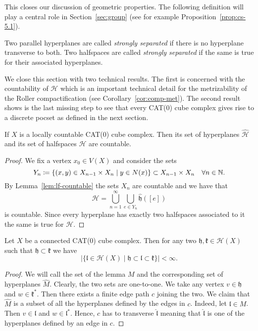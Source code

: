 This closes our discussion of geometric properties. The following definition will play a central role in Section~\ref{sec:group} (see for example Proposition~\ref{prop:cs-5.1}).

\begin{defin}
  \label{defin:strong-sep}
  Two parallel hyperplanes are called \emph{strongly separated} if there is no hyperplane transverse to both. Two halfspaces are called \emph{strongly separated} if the same is true for their associated hyperplanes.
\end{defin}

We close this section with two technical results. The first is concerned with the countability of \(\mathcal{H}\) which is an important technical detail for the metrizability of the Roller compactification (see Corollary~\ref{cor:comp-met}). The second result shows is the last missing step to see that every CAT(0) cube complex gives rise to a discrete pocset as defined in the next section.

\begin{cor}
  \label{cor:halfspace-countable}
  If \(X\) is a locally countable CAT(0) cube complex. Then its set of hyperplanes \(\mathcal{\hat H}\) and its set of halfspaces \(\mathcal{H}\) are countable.
\end{cor}

\begin{proof}
  We fix a vertex \(x_0 \in V(X)\) and consider the sets
  \[
    Y_n \coloneqq \{(x,y) \in X_{n-1} \times X_{n} \mid y \in N(x)\} \subset X_{n-1} \times X_n \quad \forall n \in \mathbb{N}.
  \]
  By Lemma~\ref{lem:lf-countable} the sets \(X_n\) are countable and we have that
  \[
    \mathcal{\hat H} = \bigcup_{n=1}^\infty \bigcup_{e \in Y_n} \mathfrak{\hat h}([e])
  \]
  is countable. Since every hyperplane has exactly two halfspaces associated to it the same is true for \(\mathcal{H}\).
\end{proof}


\begin{lemma}
  \label{lem:finite-interval}
  Let \(X\) be a connected CAT(0) cube complex. Then for any two \(\mathfrak{h,k} \in \mathcal{H}(X)\) such that \(\mathfrak{h} \subset \mathfrak{k}\) we have
  \[
    |\{\mathfrak{l} \in \mathcal{H}(X) \mid \mathfrak{h} \subset \mathfrak{l} \subset \mathfrak{k}\}| < \infty.
  \]
\end{lemma}

\begin{proof}
  We will call the set of the lemma \(M\) and the corresponding set of hyperplanes \(\hat M\). Clearly, the two sets are one-to-one. We take any vertex \(v \in \mathfrak{h}\)  and \(w \in \mathfrak{k}^\ast\). Then there exists a finite edge path \(c\) joining the two. We claim that \(\hat M\) is a subset of all the hyperplanes defined by the edges in \(c\). Indeed, let \(\mathfrak{l} \in M\). Then \(v \in \mathfrak{l}\) and \(w \in \mathfrak{l}^\ast\). Hence, \(c\) has to transverse \(\mathfrak{\hat l}\) meaning that \(\mathfrak{\hat l}\) is one of the hyperplanes defined by an edge in \(c\).
\end{proof}

